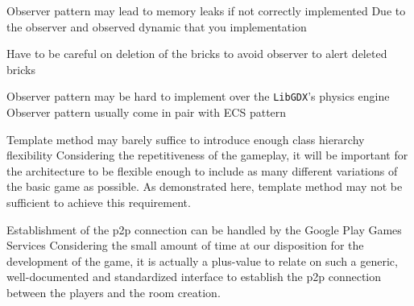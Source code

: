 \begin{description}[style=nextline]
  \item[R3\label{r3}] Observer pattern may lead to memory leaks if not correctly implemented
    \vspace{\baselineskip}
    \newline
    Due to the observer and observed dynamic that you implementation

    Have to be careful on deletion of the bricks to avoid observer to alert deleted bricks

  \item[R4\label{r4}] Observer pattern may be hard to implement over the \texttt{LibGDX}'s physics engine
    \vspace{\baselineskip}
    \newline
    Observer pattern usually come in pair with ECS pattern

  \item[R5\label{r5}] Template method may barely suffice to introduce enough class hierarchy flexibility
    \vspace{\baselineskip}
    \newline
    Considering the repetitiveness of the gameplay, it will be important for the architecture to be flexible enough to include as many different variations of the basic game as possible. As demonstrated here, template method may not be sufficient to achieve this requirement.

\end{description}

\begin{description}[style=nextline]
  \item[N1\label{n1}] Establishment of the \gls{p2p} connection can be handled by the Google Play Games Services
  \vspace{\baselineskip}
  \newline
  Considering the small amount of time at our disposition for the development of the game, it is actually a plus-value to relate on such a generic, well-documented and standardized interface to establish the \gls{p2p} connection between the players and the room creation.

\end{description}

